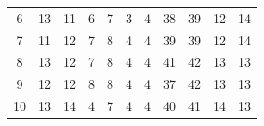 \documentclass[10pt, conference, compsocconf]{IEEEtran}
\begin{document}
\begin{table}[ht]
\begin{tabular}{| c | c | c | c | c | c | c | c | c | c | c |}
6 & 13 & 11 & 6 & 7 & 3 & 4 & 38 & 39 & 12 & 14\\

7 & 11 & 12 & 7 & 8 & 4 & 4 & 39 & 39 & 12 & 14\\

8 & 13 & 12 & 7 & 8 & 4 & 4 & 41 & 42 & 13 & 13\\

9 & 12 & 12 & 8 & 8 & 4 & 4 & 37 & 42 & 13 & 13\\ 

10 & 13 & 14 & 4 & 7 & 4 & 4 & 40 & 41 & 14 & 13\\ [1ex] %

\hline %

\end{tabular}
\label{table:tena} %
\end{table}
\end{document}
